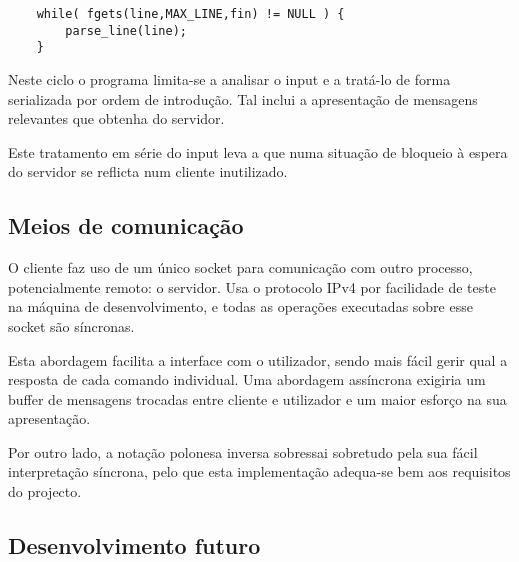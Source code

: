 	\begin{lstlisting}
	while( fgets(line,MAX_LINE,fin) != NULL ) {
		parse_line(line);
	}
	\end{lstlisting}
	
	Neste ciclo o programa limita-se a analisar o input e a tratá-lo de forma serializada por ordem de introdução.
	Tal inclui a apresentação de mensagens relevantes que obtenha do servidor.
	
	Este tratamento em série do input leva a que numa situação de bloqueio à espera do servidor se reflicta num cliente inutilizado.
		

\subsection{Meios de comunicação\label{sec:cliente_comunicacao}}

	\indent\indent O cliente faz uso de um único socket para comunicação com outro processo, potencialmente remoto: o servidor.
	Usa o protocolo IPv4 por facilidade de teste na máquina de desenvolvimento, e todas as operações executadas sobre esse socket são síncronas.
	
	Esta abordagem facilita a interface com o utilizador, sendo mais fácil gerir qual a resposta de cada comando individual.
	Uma abordagem assíncrona exigiria um buffer de mensagens trocadas entre cliente e utilizador e um maior esforço na sua apresentação.
	
	Por outro lado, a notação polonesa inversa sobressai sobretudo pela sua fácil interpretação síncrona, pelo que esta implementação adequa-se bem aos requisitos do projecto.
	
	
	
	

\subsection{Desenvolvimento futuro\label{sec:cliente_desenvolvimento}}



\clearpage
